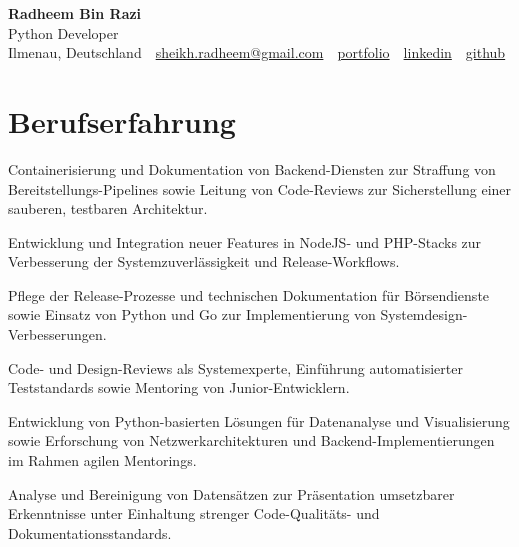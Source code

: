 \documentclass[11pt,a4paper]{resume}
\makeatletter
\newcommand{\Portfolio}{https://radheem.github.io/my-cv}
\newcommand{\PortfolioText}{portfolio}
\newcommand{\GitHub}{https://github.com/radheem}
\newcommand{\LinkedIn}{https://www.linkedin.com/in/radheem-razi}
\newcommand{\Email}{sheikh.radheem@gmail.com}
\makeatother
\begin{document}
\clearpage
{}

\begin{center}
  {\huge\bfseries Radheem Bin Razi}\\[3pt]
  {\large Python Developer}\\[6pt]
  \small
  Ilmenau, Deutschland \,\textbar\,
  \href{mailto:\Email}{\Email} \,\textbar\,
  \href{\Portfolio}{\PortfolioText} \,\textbar\,
  \href{\LinkedIn}{linkedin} \,\textbar\,
  \href{\GitHub}{github}
\end{center}
\vspace{2pt}

\section{Berufserfahrung}

\bullets
  \item Containerisierung und Dokumentation von Backend-Diensten zur Straffung von Bereitstellungs-Pipelines sowie Leitung von Code-Reviews zur Sicherstellung einer sauberen, testbaren Architektur.
  \item Entwicklung und Integration neuer Features in NodeJS- und PHP-Stacks zur Verbesserung der Systemzuverlässigkeit und Release-Workflows.
\bulletsend
\vspace{3pt}
\bullets
  \item Pflege der Release-Prozesse und technischen Dokumentation für Börsendienste sowie Einsatz von Python und Go zur Implementierung von Systemdesign-Verbesserungen.
  \item Code- und Design-Reviews als Systemexperte, Einführung automatisierter Teststandards sowie Mentoring von Junior-Entwicklern.
\bulletsend
\vspace{3pt}
\bullets
  \item Entwicklung von Python-basierten Lösungen für Datenanalyse und Visualisierung sowie Erforschung von Netzwerkarchitekturen und Backend-Implementierungen im Rahmen agilen Mentorings.
  \item Analyse und Bereinigung von Datensätzen zur Präsentation umsetzbarer Erkenntnisse unter Einhaltung strenger Code-Qualitäts- und Dokumentationsstandards.
\bulletsend
\vspace{3pt}
\end{document}
